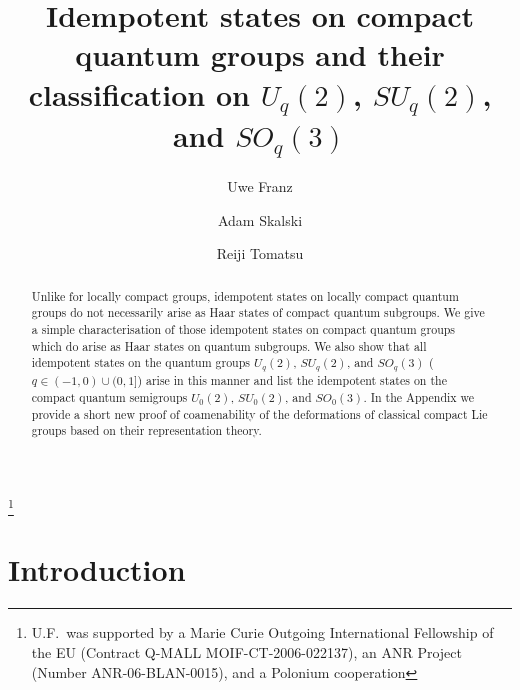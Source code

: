\documentclass[12pt]{amsart}
\theoremstyle{definition}
\theoremstyle{remark}
\numberwithin{equation}{section}
\begin{document}
\title[Idempotent states on $U_q(2)$, $SU_q(2)$, and $SO_q(3)$]{Idempotent states on compact quantum groups and their classification on $U_q(2)$, $SU_q(2)$, and $SO_q(3)$}
\author{Uwe Franz}
\address{D\'epartement de math\'ematiques de Besan\c{c}on,
Universit\'e de Franche-Comt\'e 16, route de Gray, 25 030
Besan\c{c}on cedex, France}
\thanks{U.F.\ was supported by a Marie Curie Outgoing International
Fellowship of the EU (Contract Q-MALL MOIF-CT-2006-022137), an ANR Project
(Number ANR-06-BLAN-0015), and a Polonium cooperation}

\author{Adam Skalski}
\address{Mathematical Institute of the Polish Academy of Sciences,
ul.\'Sniadeckich 8, 00-956 Warszawa, Poland}

\author{Reiji Tomatsu}
\address{Department of Mathematics
Tokyo University of Science,
Yamazaki 2641, Noda, Chiba, 278-8510,
Japan}

\begin{abstract} Unlike for locally compact groups, idempotent states on locally compact quantum groups do not necessarily arise as Haar states of compact
quantum subgroups. We give a simple characterisation of those idempotent states on compact quantum groups which do arise as Haar
states on quantum subgroups. We also show that all idempotent states on the quantum groups  $U_q(2)$, $SU_q(2)$, and $SO_q(3)$
($q \in (-1,0)\cup (0,1]$) arise in this manner and list the idempotent states on the compact quantum semigroups $U_0(2)$,
$SU_0(2)$, and $SO_0(3)$. In the Appendix we provide a short new proof of coamenability of the deformations of classical compact
Lie groups based on their representation theory.
\end{abstract} 
 \maketitle

\section{Introduction}
\end{document}
